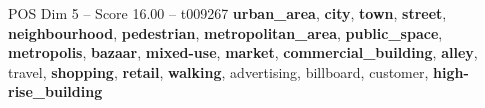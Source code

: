 \begin{textsample}{POS Dim 5 – Score 16.00 – t009267}  \label{ex:f5_pos_029}
\textbf{urban\_area}, \textbf{city}, \textbf{town}, \textbf{street}, \textbf{neighbourhood}, \textbf{pedestrian}, \textbf{metropolitan\_area}, \textbf{public\_space}, \textbf{metropolis}, \textbf{bazaar}, \textbf{mixed-use}, \textbf{market}, \textbf{commercial\_building}, \textbf{alley}, travel, \textbf{shopping}, \textbf{retail}, \textbf{walking}, advertising, billboard, customer, \textbf{high-rise\_building}

\end{textsample}
